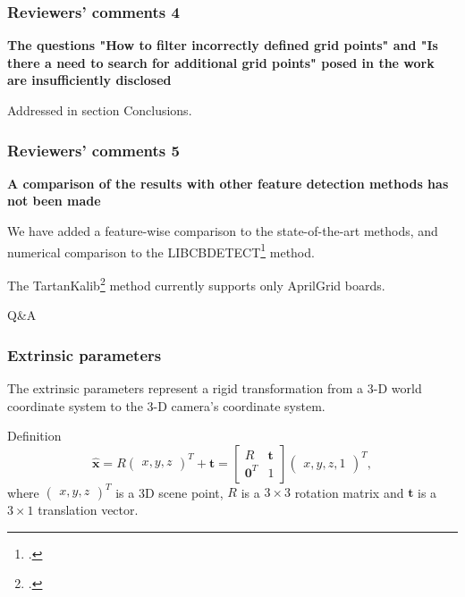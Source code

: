 \documentclass{beamer}
\begin{document}
\begin{frame}
	\frametitle{Reviewers' comments 4}
	\textbf{The questions "How to filter incorrectly defined grid points" and "Is there a
		need to search for additional grid points" posed in the work are insufficiently disclosed}

	Addressed in section Conclusions.
\end{frame}

\begin{frame}
	\frametitle{Reviewers' comments 5}
	\textbf{A comparison of the results with other feature detection methods has not been made}

	We have added a feature-wise comparison to the state-of-the-art methods, and
	numerical comparison to the
	LIBCBDETECT\footcite{geigerAutomaticCameraRange2012} method.

	The TartanKalib\footcite{duisterhofTartanCalibIterativeWideAngle2022} method
	currently supports only AprilGrid boards.
\end{frame}

\begin{frame}[standout]
	Q\&A

\end{frame}

\appendix

\begin{frame}
	\frametitle{Extrinsic parameters}
	The extrinsic parameters represent a rigid transformation from a 3-D world
	coordinate system to the 3-D camera’s coordinate system.

	\begin{exampleblock}{Definition}
		\begin{equation*}
			\widehat{\mathbf{x}} =
			R \begin{pmatrix}
				x, y, z
			\end{pmatrix}^{T} + \mathbf{t} =
			\begin{bmatrix}
				R              & \mathbf{t} \\
				\mathbf{0}^{T} & 1
			\end{bmatrix} \begin{pmatrix}
				x, y, z, 1
			\end{pmatrix}^{T},
		\end{equation*}
		where
		\(\begin{pmatrix}
			x, y, z
		\end{pmatrix}^{T}\) is a 3D scene point,
		\(R\) is a \(3 \times 3\) rotation matrix
		and \(\mathbf{t}\) is
		a \(3 \times 1\) translation vector.
	\end{exampleblock}
\end{frame}
\end{document}
